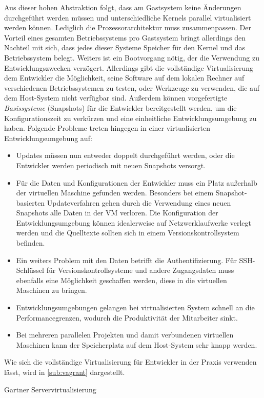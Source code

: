 Aus dieser hohen Abstraktion folgt, dass am Gastsystem keine Änderungen durchgeführt werden müssen und unterschiedliche Kernels parallel virtualisiert werden können.
Lediglich die Prozessorarchitektur muss zusammenpassen.
Der Vorteil eines gesamten Betriebssystems pro Gastsystem bringt allerdings den Nachteil mit sich, dass jedes dieser Systeme Speicher für den Kernel und das Betriebssystem belegt. Weiters ist ein Bootvorgang nötig, der die Verwendung zu Entwicklungszwecken verzögert.
Allerdings gibt die vollständige Virtualisierung dem Entwickler die Möglichkeit, seine Software auf dem lokalen Rechner auf verschiedenen Betriebssystemen zu testen, oder Werkzeuge zu verwenden, die auf dem Host-System nicht verfügbar sind.
Außerdem können vorgefertigte \emph{Basissysteme} (Snapshots) für die Entwickler bereitgestellt werden, um die Konfigurationszeit zu verkürzen und eine einheitliche Entwicklungsumgebung zu haben.
Folgende Probleme treten hingegen in einer virtualisierten Entwicklungsumgebung auf:
\begin{itemize}
\item Updates müssen nun entweder doppelt durchgeführt werden, oder die Entwickler werden periodisch mit neuen Snapshots versorgt.
\item Für die Daten und Konfigurationen der Entwickler muss ein Platz außerhalb der virtuellen Maschine gefunden werden. Besonders bei einem Snapshot-basierten Updateverfahren gehen durch die Verwendung eines neuen Snapshots alle Daten in der VM verloren. Die Konfiguration der Entwicklungsumgebung können idealerweise auf Netzwerklaufwerke verlegt werden und die Quelltexte sollten sich in einem Versionskontrollsystem befinden.
\item Ein weiters Problem mit den Daten betrifft die Authentifizierung. Für SSH-Schlüssel für Versionskontrollsysteme und andere Zugangsdaten muss ebenfalls eine Möglichkeit geschaffen werden, diese in die virtuellen Maschinen zu bringen. 
\item Entwicklungsumgebungen gelangen bei virtualisierten System schnell an die Performancegrenzen, wodurch die Produktivität der Mitarbeiter sinkt.
\item Bei mehreren parallelen Projekten und damit verbundenen virtuellen Maschinen kann der Speicherplatz auf dem Host-System sehr knapp werden.
\end{itemize}
Wie sich die vollständige Virtualisierung für Entwickler in der Praxis verwenden lässt, wird in \cref{sub:vagrant} dargestellt.  

Gartner Servervirtualisierung
